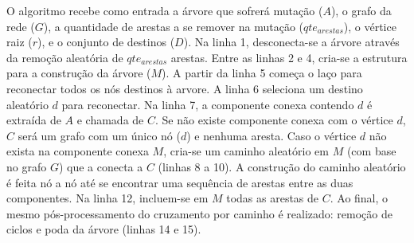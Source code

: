 O algoritmo recebe como entrada a árvore que sofrerá mutação ($A$), o grafo da rede ($G$), a quantidade de arestas a se remover na mutação ($qte_{arestas}$), o vértice raiz ($r$), e o conjunto de destinos ($D$). Na linha 1, desconecta-se a árvore através da remoção aleatória de $qte_{arestas}$ arestas. Entre as linhas 2 e 4, cria-se a estrutura para a construção da árvore ($M$). A partir da linha 5 começa o laço para reconectar todos os nós destinos à arvore. A linha 6 seleciona um destino aleatório $d$ para reconectar. Na linha 7, a componente conexa contendo $d$ é extraída de $A$ e chamada de $C$. Se não existe componente conexa com o vértice $d$, $C$ será um grafo com um único nó ($d$) e nenhuma aresta. Caso o vértice $d$ não exista na componente conexa $M$, cria-se um caminho aleatório em $M$ (com base no grafo $G$) que a conecta a $C$ (linhas 8 a 10). A construção do caminho aleatório é feita nó a nó até se encontrar uma sequência de arestas entre as duas componentes. Na linha 12, incluem-se em $M$ todas as arestas de $C$. Ao final, o mesmo pós-processamento do cruzamento por caminho é realizado: remoção de ciclos e poda da árvore (linhas 14 e 15).